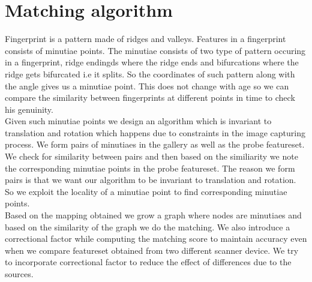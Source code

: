 \documentclass{article}
\begin{document}
\section*{Matching algorithm}
Fingerprint is a pattern made of ridges and valleys. Features in a fingerprint consists of minutiae points. The minutiae consists of two type of pattern occuring in a fingerprint, ridge endingds where the ridge ends and 
bifurcations  where the ridge gets bifurcated i.e it splits. So the coordinates of such pattern along with the angle gives us a minutiae point. This does not change with age so we can compare the similarity between fingerprints
at different points in time to check his genuinity.  \\
Given such minutiae points we design an algorithm which is invariant to translation and rotation which happens due to constraints in the image capturing process. 
We form pairs of minutiaes in the gallery as well as the probe featureset. We check for similarity between pairs and then based on the similiarity we note the corresponding minutiae points in the probe featureset.
The reason we form pairs is that we want our algorithm to be invariant to translation and rotation. So we exploit the locality of a minutiae point to find corresponding minutiae points. \\
Based on the mapping obtained
we grow a graph where nodes are minutiaes and based on the similarity of the graph we do the matching. We also introduce a correctional factor while computing the matching score to maintain accuracy even when we
compare featureset obtained from two different scanner device. We try to incorporate correctional factor to reduce the effect of differences due to the sources.
\end{document}
